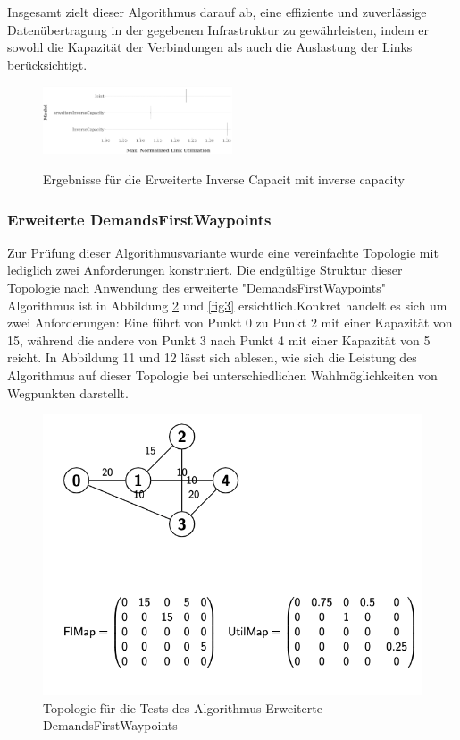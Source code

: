 \documentclass[sigconf, nonacm, review]{acmart}
\begin{document}
Insgesamt zielt dieser Algorithmus darauf ab, eine effiziente und zuverlässige Datenübertragung in der gegebenen Infrastruktur zu gewährleisten, indem er sowohl die Kapazität der Verbindungen als auch die Auslastung der Links berücksichtigt.
\begin{figure}[h]
\centering
{\hspace{+6cm}\includegraphics[width=0.5\textwidth]{a6.png}} 
\caption{ Ergebnisse für die Erweiterte Inverse Capacit mit inverse capacity} 
\label{fig:12}
\end{figure}


\subsubsection{Erweiterte DemandsFirstWaypoints} 

Zur Prüfung dieser Algorithmusvariante wurde eine vereinfachte Topologie mit lediglich zwei Anforderungen konstruiert. Die endgültige Struktur dieser Topologie nach Anwendung des erweiterte "DemandsFirstWaypoints" Algorithmus ist in Abbildung \ref{fig2} und \ref{fig3}  ersichtlich.Konkret handelt es sich um zwei Anforderungen: Eine führt von Punkt 0 zu Punkt 2 mit einer Kapazität von 15, während die andere von Punkt 3 nach Punkt 4 mit einer Kapazität von 5 reicht. In Abbildung 11 und 12 lässt sich ablesen, wie sich die Leistung des Algorithmus auf dieser Topologie bei unterschiedlichen Wahlmöglichkeiten von Wegpunkten darstellt.

\begin{figure}
\centering
\includegraphics[width=\linewidth]{figures/2.png}
\caption{Topologie für die Tests des Algorithmus Erweiterte DemandsFirstWaypoints }
\label{fig2}
\end{figure}
\end{document}
